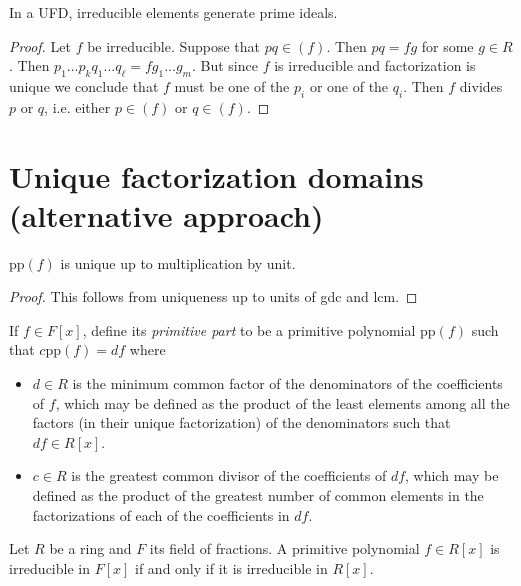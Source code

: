 \begin{lemma}
\label{lemma-ufd-irred-eleme-gener-prime}
In a UFD, irreducible elements generate prime
ideals.
\end{lemma}

\begin{proof}
Let $f$ be irreducible. Suppose that
$pq\in(f)$. Then $pq=fg$ for some  $g\in
R$. Then $p_1\ldots p_kq_1\ldots
q_\ell=fg_1\ldots g_m$. But since $f$ is
irreducible and factorization is unique we
conclude that $f$ must be one of the
 $p_i$ or one of the $q_i$. Then $f$ divides
 $p$ or $q$, i.e. either $p\in(f)$
or $q\in(f)$.
\end{proof}

\section{Unique factorization domains
(alternative approach)}
\label{section-UFD-alternative}


\begin{lemma}
\label{lemma-primi-part-uniqu-up-unit}
$\text{pp}(f)$ is unique up to multiplication
by unit.
\end{lemma}

\begin{proof}
This follows from uniqueness up to units of
gdc and lcm.
\end{proof}

\begin{definition}
\label{definition-primitive-part}
If $f\in F[x]$, define its {\it primitive
part} to be a primitive polynomial
$\text{pp}(f)$ such that $c\text{pp}(f)=df$
where
\begin{itemize}
\item $d\in R$ is the minimum common
factor of the denominators of the
coefficients of $f$, which may be defined as
the product of the least elements among all
the factors (in their unique
factorization) of the denominators such that
$df \in R[x]$.
\item $c\in R$ is the greatest common divisor
of the coefficients of $df$, which
may be defined as the product of the greatest
number of common elements in the
factorizations of each of the coefficients in
$df$.
\end{itemize}
\end{definition}

\begin{lemma}[Gauss]
\label{lemma-true-gauss}
Let $R$ be a ring and $F$ its field of
fractions. A primitive polynomial $f\in
R[x]$ is irreducible in $F[x]$ if and only if
it is irreducible in $R[x]$.
\end{lemma}

